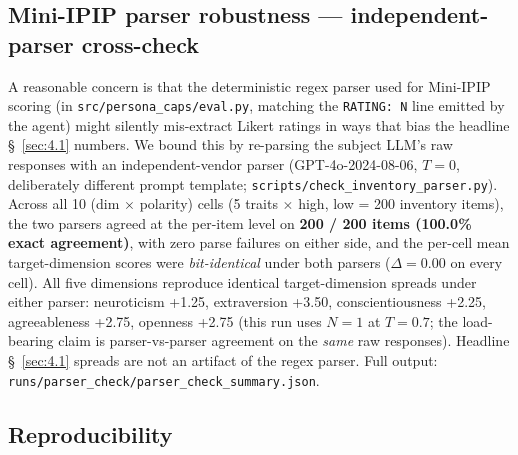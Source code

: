 \subsection{Mini-IPIP parser robustness --- independent-parser cross-check}
\label{app:A.5}

A reasonable concern is that the deterministic regex parser used for Mini-IPIP scoring (in \texttt{src/\allowbreak{}persona\_\allowbreak{}caps/\allowbreak{}eval.py}, matching the \texttt{RATING: N} line emitted by the agent) might silently mis-extract Likert ratings in ways that bias the headline \S~\ref{sec:4.1} numbers. We bound this by re-parsing the subject LLM's raw responses with an independent-vendor parser (GPT-4o-2024-08-06, $T = 0$, deliberately different prompt template; \texttt{scripts/\allowbreak{}check\_\allowbreak{}inventory\_\allowbreak{}parser.py}). Across all 10 (dim $\times$ polarity) cells (5 traits $\times$ {high, low} = 200 inventory items), the two parsers agreed at the per-item level on \textbf{200 / 200 items (100.0\% exact agreement)}, with zero parse failures on either side, and the per-cell mean target-dimension scores were \textit{bit-identical} under both parsers ($\Delta = 0.00$ on every cell). All five dimensions reproduce identical target-dimension spreads under either parser: neuroticism +1.25, extraversion +3.50, conscientiousness +2.25, agreeableness +2.75, openness +2.75 (this run uses $N = 1$ at $T = 0.7$; the load-bearing claim is parser-vs-parser agreement on the \textit{same} raw responses). Headline \S~\ref{sec:4.1} spreads are not an artifact of the regex parser. Full output: \texttt{runs/\allowbreak{}parser\_\allowbreak{}check/\allowbreak{}parser\_\allowbreak{}check\_\allowbreak{}summary.json}.

\subsection{Reproducibility}
\label{app:A.6}


